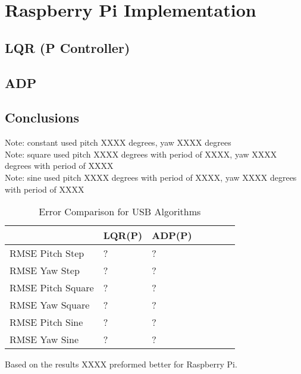 \chapter{Raspberry Pi Implementation}

\section{LQR (P Controller)}

\section{ADP}


\section{Conclusions}
Note: constant used pitch XXXX degrees, yaw XXXX degrees\\
Note: square used pitch XXXX degrees with period of XXXX, yaw XXXX degrees with period of XXXX\\
Note: sine used pitch XXXX degrees with period of XXXX, yaw XXXX degrees with period of XXXX\\
\begin{table}[h!]
    \centering
    \begin{tabular}{l|l|l|l|l|l|l}
        \toprule
        \textbf{} & \textbf{LQR(P)} & \textbf{ADP(P)} \\
        \toprule
        RMSE Pitch Step & ? & ?  \\
        RMSE Yaw Step & ? & ? \\
        RMSE Pitch Square & ? & ? \\
        RMSE Yaw Square & ? & ? \\
        RMSE Pitch Sine & ? & ? \\
        RMSE Yaw Sine & ? & ? \\
        \bottomrule
    \end{tabular}
    \caption{Error Comparison for USB Algorithms}
    \label{tab:USB_RMSE}
\end{table}
Based on the results XXXX preformed better for Raspberry Pi.


